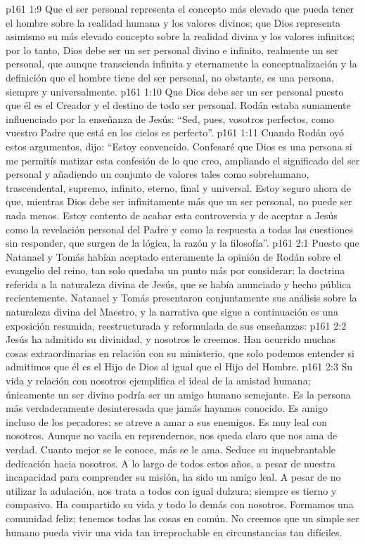 \vs p161 1:9 Que el ser personal representa el concepto más elevado que pueda tener el hombre sobre la realidad humana y los valores divinos; que Dios representa asimismo su más elevado concepto sobre la realidad divina y los valores infinitos; por lo tanto, Dios debe ser un ser personal divino e infinito, realmente un ser personal, que aunque transcienda infinita y eternamente la conceptualización y la definición que el hombre tiene del ser personal, no obstante, es una persona, siempre y universalmente.
\vs p161 1:10 Que Dios debe ser un ser personal puesto que él es el Creador y el destino de todo ser personal. Rodán estaba sumamente influenciado por la enseñanza de Jesús: “Sed, pues, vosotros perfectos, como vuestro Padre que está en los cielos es perfecto”.
\vs p161 1:11 \pc Cuando Rodán oyó estos argumentos, dijo: “Estoy convencido. Confesaré que Dios es una persona si me permitís matizar esta confesión de lo que creo, ampliando el significado del ser personal y añadiendo un conjunto de valores tales como sobrehumano, trascendental, supremo, infinito, eterno, final y universal. Estoy seguro ahora de que, mientras Dios debe ser infinitamente más que un ser personal, no puede ser nada menos. Estoy contento de acabar esta controversia y de aceptar a Jesús como la revelación personal del Padre y como la respuesta a todas las cuestiones sin responder, que surgen de la lógica, la razón y la filosofía”.
\vs p161 2:1 Puesto que Natanael y Tomás habían aceptado enteramente la opinión de Rodán sobre el evangelio del reino, tan solo quedaba un punto más por considerar: la doctrina referida a la naturaleza divina de Jesús, que se había anunciado y hecho pública recientemente. Natanael y Tomás presentaron conjuntamente sus análisis sobre la naturaleza divina del Maestro, y la narrativa que sigue a continuación es una exposición resumida, reestructurada y reformulada de sus enseñanzas:
\vs p161 2:2 Jesús ha admitido su divinidad, y nosotros le creemos. Han ocurrido muchas cosas extraordinarias en relación con su ministerio, que solo podemos entender si admitimos que él es el Hijo de Dios al igual que el Hijo del Hombre.
\vs p161 2:3 Su vida y relación con nosotros ejemplifica el ideal de la amistad humana; únicamente un ser divino podría ser un amigo humano semejante. Es la persona más verdaderamente desinteresada que jamás hayamos conocido. Es amigo incluso de los pecadores; se atreve a amar a sus enemigos. Es muy leal con nosotros. Aunque no vacila en reprendernos, nos queda claro que nos ama de verdad. Cuanto mejor se le conoce, más se le ama. Seduce su inquebrantable dedicación hacia nosotros. A lo largo de todos estos años, a pesar de nuestra incapacidad para comprender su misión, ha sido un amigo leal. A pesar de no utilizar la adulación, nos trata a todos con igual dulzura; siempre es tierno y compasivo. Ha compartido su vida y todo lo demás con nosotros. Formamos una comunidad feliz; tenemos todas las cosas en común. No creemos que un simple ser humano pueda vivir una vida tan irreprochable en circunstancias tan difíciles.

